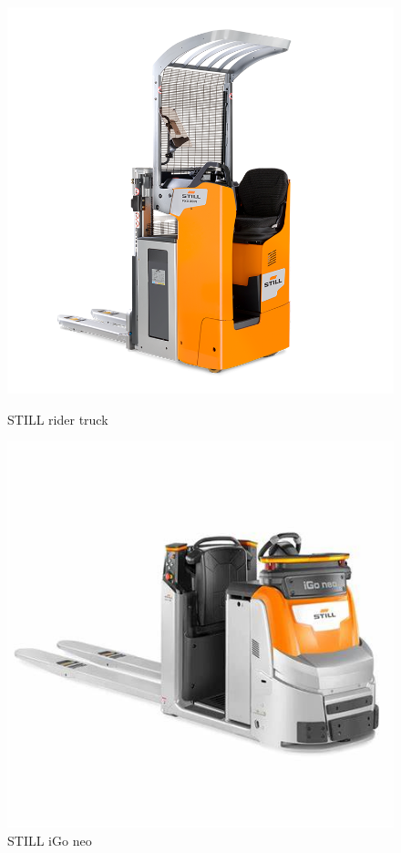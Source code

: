 \begin{figure}[H]
    \centering
    \begin{minipage}{0.45\textwidth}
        \centering
        \includegraphics[width=\linewidth]{images/Chap0/double-.png} %
        \caption{STILL rider truck}
        \label{double-}
    \end{minipage}
    \begin{minipage}{0.45\textwidth}
        \centering
        \includegraphics[width=\linewidth]{images/Chap0/iGoNeo.jpg} %
        \caption{STILL iGo neo}
        \label{iGoNeo}
    \end{minipage}
\end{figure}

